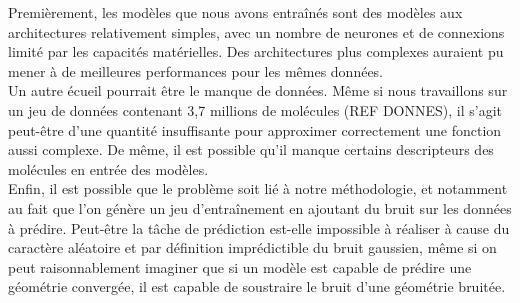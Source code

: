 \par Premièrement, les modèles que nous avons entraînés sont des modèles aux architectures relativement simples, avec un nombre de neurones et de connexions limité par les capacités matérielles. Des architectures plus complexes auraient pu mener à de meilleures performances pour les mêmes données. \\
Un autre écueil pourrait être le manque de données. Même si nous travaillons sur un jeu de données contenant 3,7 millions de molécules (REF DONNES), il s'agit peut-être d'une quantité insuffisante pour approximer correctement une fonction aussi complexe. De même, il est possible qu'il manque certains descripteurs des molécules en entrée des modèles.\\
Enfin, il est possible que le problème soit lié à notre méthodologie, et notamment au fait que l'on génère un jeu d'entraînement en ajoutant du bruit sur les données à prédire. Peut-être la tâche de prédiction est-elle impossible à réaliser à cause du caractère aléatoire et par définition imprédictible du bruit gaussien, même si on peut raisonnablement imaginer que si un modèle est capable de prédire une géométrie convergée, il est capable de soustraire le bruit d'une géométrie bruitée.